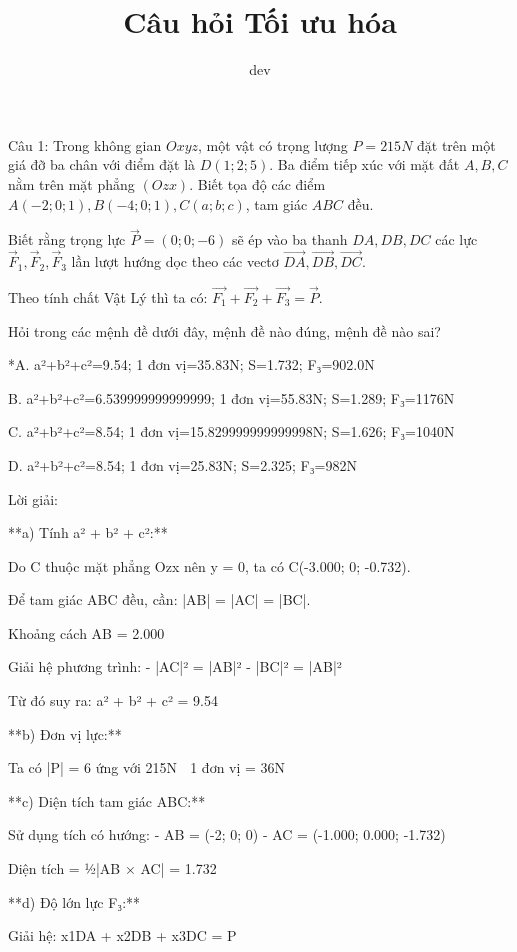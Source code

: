 \documentclass[a4paper,12pt]{article}
\begin{document}
\title{Câu hỏi Tối ưu hóa}
\author{dev}
\maketitle

Câu 1: Trong không gian \(Oxyz\), một vật có trọng lượng \(P=215N\) đặt trên một giá đỡ ba chân với điểm đặt là \(D(1; 2; 5)\). Ba điểm tiếp xúc với mặt đất \(A, B, C\) nằm trên mặt phẳng \((Ozx)\). Biết tọa độ các điểm \(A(-2; 0; 1), B(-4; 0; 1), C(a; b; c)\), tam giác \(ABC\) đều. 

Biết rằng trọng lực \(\overrightarrow{P}=(0; 0; -6)\) sẽ ép vào ba thanh \(DA, DB, DC\) các lực \(\overrightarrow{F}_1, \overrightarrow{F}_2, \overrightarrow{F}_3\) lần lượt hướng dọc theo các vectơ \(\overrightarrow{DA}, \overrightarrow{DB}, \overrightarrow{DC}\). 

Theo tính chất Vật Lý thì ta có: \(\overrightarrow{F_1}+\overrightarrow{F_2}+\overrightarrow{F_3}=\overrightarrow{P}\).

Hỏi trong các mệnh đề dưới đây, mệnh đề nào đúng, mệnh đề nào sai?

*A. a²+b²+c²=9.54; 1 đơn vị=35.83N; S=1.732; F₃=902.0N

B. a²+b²+c²=6.539999999999999; 1 đơn vị=55.83N; S=1.289; F₃=1176N

C. a²+b²+c²=8.54; 1 đơn vị=15.829999999999998N; S=1.626; F₃=1040N

D. a²+b²+c²=8.54; 1 đơn vị=25.83N; S=2.325; F₃=982N

Lời giải:


**a) Tính a² + b² + c²:**

Do C thuộc mặt phẳng Ozx nên y = 0, ta có C(-3.000; 0; -0.732).

Để tam giác ABC đều, cần: |AB| = |AC| = |BC|.

Khoảng cách AB = 2.000

Giải hệ phương trình:
- |AC|² = |AB|²  
- |BC|² = |AB|²

Từ đó suy ra: a² + b² + c² = 9.54

**b) Đơn vị lực:**

Ta có |P⃗| = 6 ứng với 215N
⟹ 1 đơn vị = 36N

**c) Diện tích tam giác ABC:**

Sử dụng tích có hướng:
- AB⃗ = (-2; 0; 0)
- AC⃗ = (-1.000; 0.000; -1.732)

Diện tích = ½|AB⃗ × AC⃗| = 1.732

**d) Độ lớn lực F₃:**

Giải hệ: x1DA⃗ + x2DB⃗ + x3DC⃗ = P⃗
\end{document}
